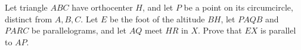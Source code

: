 Let triangle $ABC$ have orthocenter $H$, and let $P$ be a point on its circumcircle, distinct from $A, B, C$. Let $E$ be the foot of the altitude $BH$, let $PAQB$ and $PARC$ be parallelograms, and let $AQ$ meet $HR$ in $X$. Prove that $EX$ is parallel to $AP$.

